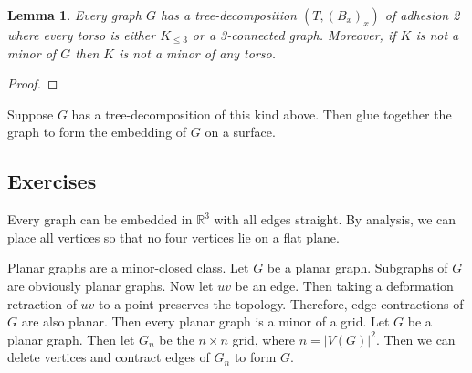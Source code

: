 \documentclass{article}
\newtheorem{lemma}[theorem]{Lemma}
\begin{document}
\begin{lemma}
    Every graph $G$ has a tree-decomposition $(T, (B_x)_x)$ of adhesion 2 where every torso is either $K_{\leq 3}$ or a 3-connected graph. Moreover, if $K$ is not a minor of $G$ then $K$ is not a minor of any torso. 
\end{lemma}

\begin{proof}
\end{proof}

Suppose $G$ has a tree-decomposition of this kind above. Then glue together the graph to form the embedding of $G$ on a surface. 

\subsection{Exercises}
Every graph can be embedded in $\mathbb{R}^3$ with all edges straight. By analysis, we can place all vertices so that no four vertices lie on a flat plane.

Planar graphs are a minor-closed class. Let $G$ be a planar graph. Subgraphs of $G$ are obviously planar graphs. Now let $uv$ be an edge. Then taking a deformation retraction of $uv$ to a point preserves the topology. Therefore, edge contractions of $G$ are also planar. Then every planar graph is a minor of a grid. Let $G$ be a planar graph. Then let $G_n$ be the $n \times n$ grid, where $n = |V(G)|^2$. Then we can delete vertices and contract edges of $G_n$ to form $G$. 

\printbibliography[]
\end{document}
